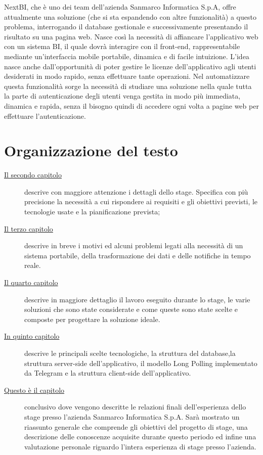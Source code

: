 NextBI, che è uno dei team dell'azienda Sanmarco Informatica S.p.A, offre attualmente una soluzione (che si sta espandendo con altre funzionalità) a questo problema, interrogando il database  gestionale e successivamente presentando il risultato su una pagina web. Nasce così la necessità di affiancare l'applicativo web con un sistema BI, il quale dovrà interagire con il front-end, rappresentabile mediante un'interfaccia mobile portabile, dinamica e di facile intuizione. L'idea nasce anche dall'opportunità di poter gestire le  licenze dell'applicativo agli utenti desiderati in modo rapido, senza effettuare tante operazioni. Nel automatizzare questa funzionalità sorge la necessità di studiare una soluzione nella quale tutta la parte di autenticazione degli utenti venga gestita in modo più immediata, dinamica e rapida, senza il bisogno quindi di accedere ogni volta a pagine web per effettuare l'autenticazione.

\section{Organizzazione del testo}

\begin{description}
    \item[{\hyperref[cap:processi-metodologie]{Il secondo capitolo}}] descrive con maggiore attenzione i dettagli dello stage. Specifica con più precisione la necessità a cui rispondere ai requisiti e gli obiettivi previsti, le tecnologie usate e la pianificazione prevista;
    
    \item[{\hyperref[cap:definizione-problema]{Il terzo capitolo}}] descrive in breve i motivi ed alcuni problemi legati alla necessità di un sistema portabile, della trasformazione dei dati e delle notifiche in tempo reale.
    
    \item[{\hyperref[cap:analisi-requisiti]{Il quarto capitolo}}] descrive in maggiore dettaglio il lavoro eseguito durante lo stage, le varie soluzioni che sono state considerate e come queste sono state scelte e composte per progettare la soluzione ideale.
    
    \item[{\hyperref[cap:progettazione-codifica]{In quinto capitolo}}] descrive le principali scelte tecnologiche, la struttura del database,la struttura server-side dell'applicativo, il modello Long Polling implementato da Telegram e la struttura client-side dell'applicativo.
    
    \item[{\hyperref[cap:conclusioni]{Questo è il capitolo}}] conclusivo dove vengono descritte le relazioni finali dell'esperienza dello stage presso l'azienda Sanmarco Informatica S.p.A. Sarà mostrato un riassunto generale che comprende gli obiettivi del progetto di stage, una descrizione delle conoscenze acquisite durante questo periodo ed infine una valutazione personale riguardo l'intera esperienza di stage presso l'azienda. 
\end{description}

